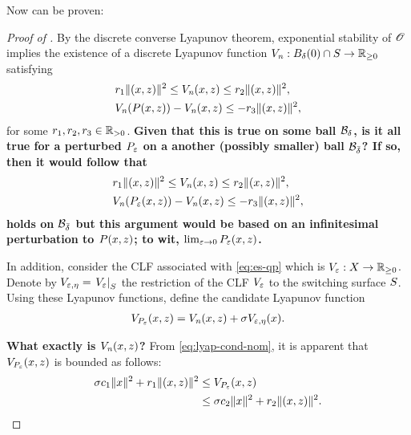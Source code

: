 \documentclass[twocolumn]{article}
\begin{document}
Now  can be proven:
\begin{proof} [Proof of ]
  By the discrete converse Lyapunov theorem, exponential stability of $\Orbit$ implies the existence of a discrete Lyapunov function $\Vn : B_{\delta}(0) \cap \S \to \Rnn$ satisfying
  \begin{align}
    \nonumber
    &r_{1} \| (\zdx, \zdz) \|^{2} \leq \Vn(\zdx, \zdz) \leq r_{2} \| (\zdx, \zdz) \|^2,\\
    \label{eq:lyap-cond-nom}
    &\Vn(\P(\zdx, \zdz)) - \Vn(\zdx, \zdz) \leq -r_{3} \| (\zdx, \zdz) \|^{2},
  \end{align}
  for some $r_{1}, r_{2}, r_{3} \in \Rpd$.
  {\bf Given that this is true on some ball $\B_{\delta}$, is it all true for a perturbed $\Pe$ on a another (possibly smaller) ball $\B_{\bar \delta}$? If so, then it would follow that
    \begin{align}
      \nonumber
      &r_{1} \| (\zdx, \zdz) \|^{2} \leq \Vn(\zdx, \zdz) \leq r_{2} \| (\zdx, \zdz) \|^2,\\
      \label{eq:lyap-cond-pert}
      &\Vn(\P_{\resclfparam}(\zdx, \zdz)) - \Vn(\zdx, \zdz) \leq -r_{3} \| (\zdx, \zdz) \|^{2},
    \end{align}
    holds on $\B_{\bar \delta}$ but this argument would be based on an infinitesimal perturbation to $P(\zdx, \zdz)$; to wit, $\limeps \Pe(\zdx, \zdz)$.}

  In addition, consider the CLF associated with \eqref{eq:es-qp} which is $\Ve : \zdX \to \Rnn$.
  Denote by $\Vex = \VeS$ the restriction of the CLF $\Ve$ to the switching surface $\S$.
  Using these Lyapunov functions, define the candidate Lyapunov function
  \begin{align}
    \VP(\zdx, \zdz) = \Vn(\zdx, \zdz) + \sigma \Vex(\zdx).
  \end{align}

  {\bf What exactly is $\Vn(\zdx, \zdz)$?}
  From \eqref{eq:lyap-cond-nom}, it is apparent that $\VP(\zdx, \zdz)$ is bounded as follows:
  \begin{align}
    \sigma c_{1} \| \zdx \|^{2} + r_{1} \| (\zdx, \zdz) \|^{2} &\leq \VP(\zdx, \zdz)\\
    \nonumber
    &\leq \sigma c_{2} \| \zdx \|^{2} + r_{2} \| (\zdx, \zdz) \|^{2}.
  \end{align}
  

\end{proof}
\end{document}
